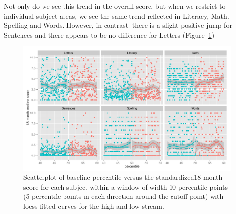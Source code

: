 \documentclass[11pt]{article}
\begin{document}
 Not only do we see this trend in the overall score, but when we restrict to individual subject areas, we see the same trend reflected in Literacy, Math, Spelling and Words. However, in contrast, there is a slight positive jump for Sentences and there appears to be no difference for Letters (Figure~\ref{fig:RD_scatter_subject}). \\
 




  \begin{figure}[ht]
 \centering
 \includegraphics[scale=0.65]{RD_scatter_subject.pdf}
 \caption{Scatterplot of baseline percentile versus the standardized18-month score for each subject within a window of width 10 percentile points (5 percentile points in each direction around the cutoff point) with loess fitted curves for the high and low stream.}
 \label{fig:RD_scatter_subject}
 \end{figure}
\end{document}

